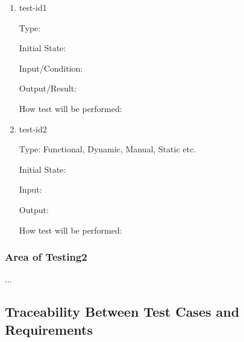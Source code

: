 \documentclass[12pt, titlepage]{article}
\begin{document}
\begin{enumerate}

\item{test-id1\\}

Type: 
					
Initial State: 
					
Input/Condition: 
					
Output/Result: 
					
How test will be performed: 
					
\item{test-id2\\}

Type: Functional, Dynamic, Manual, Static etc.
					
Initial State: 
					
Input: 
					
Output: 
					
How test will be performed: 

\end{enumerate}

\subsubsection{Area of Testing2}

...

\subsection{Traceability Between Test Cases and Requirements}

\end{document}
